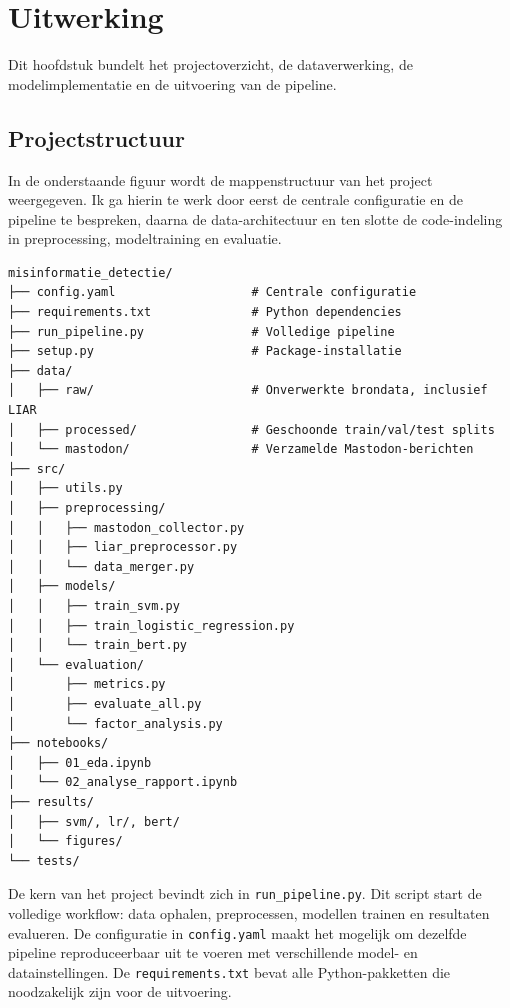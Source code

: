 ﻿%

\chapter{Uitwerking}
\label{ch:uitwerking}

Dit hoofdstuk bundelt het projectoverzicht, de dataverwerking, de modelimplementatie en de uitvoering van de pipeline.

\section{Projectstructuur}

In de onderstaande figuur wordt de mappenstructuur van het project weergegeven. Ik ga hierin te werk door eerst de centrale configuratie en de pipeline te bespreken, daarna de data-architectuur en ten slotte de code-indeling in preprocessing, modeltraining en evaluatie.

\begin{verbatim}
misinformatie_detectie/
├── config.yaml                   # Centrale configuratie
├── requirements.txt              # Python dependencies
├── run_pipeline.py               # Volledige pipeline
├── setup.py                      # Package-installatie
├── data/
│   ├── raw/                      # Onverwerkte brondata, inclusief LIAR
│   ├── processed/                # Geschoonde train/val/test splits
│   └── mastodon/                 # Verzamelde Mastodon-berichten
├── src/
│   ├── utils.py
│   ├── preprocessing/
│   │   ├── mastodon_collector.py
│   │   ├── liar_preprocessor.py
│   │   └── data_merger.py
│   ├── models/
│   │   ├── train_svm.py
│   │   ├── train_logistic_regression.py
│   │   └── train_bert.py
│   └── evaluation/
│       ├── metrics.py
│       ├── evaluate_all.py
│       └── factor_analysis.py
├── notebooks/
│   ├── 01_eda.ipynb
│   └── 02_analyse_rapport.ipynb
├── results/
│   ├── svm/, lr/, bert/
│   └── figures/
└── tests/
\end{verbatim}

De kern van het project bevindt zich in \texttt{run\_pipeline.py}. Dit script start de volledige workflow: data ophalen, preprocessen, modellen trainen en resultaten evalueren. De configuratie in \texttt{config.yaml} maakt het mogelijk om dezelfde pipeline reproduceerbaar uit te voeren met verschillende model- en datainstellingen. De \texttt{requirements.txt} bevat alle Python-pakketten die noodzakelijk zijn voor de uitvoering.

